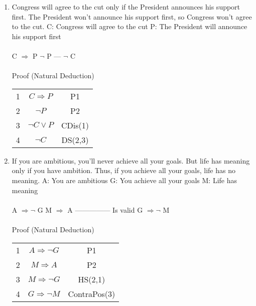 \documentclass[]{article}
\begin{document}
\begin{enumerate}
    \item Congress will agree to the cut only if the President announces his support first. The President won’t announce his support first, so Congress won’t agree to the cut.
    \newline C: Congress will agree to the cut
    \newline P: The President will announce his support first
    \\\\ C $\Rightarrow$ P
    \newline $\neg$ P
    \newline ---
    \newline $\neg$ C
    \\\\ Proof (Natural Deduction)
    \begin{tabular}{c| c | c}
        1 & $C \Rightarrow P$ & P1 \\
        2 & $\neg P$ & P2 \\
        3 & $\neg C \lor P$ & CDis(1) \\
        4 & $\neg C$ & DS(2,3) \\
    \end{tabular}

    \item If you are ambitious, you’ll never achieve all your goals. But life has meaning only if you have ambition. Thus, if you achieve all your goals, life has no meaning.
    \newline A: You are ambitious
    \newline G: You achieve all your goals
    \newline M: Life has meaning
    \\\\ A $\Rightarrow \neg$ G
    \newline M $\Rightarrow$ A
    \newline ---------------\hspace{3mm} Is valid
    \newline G $\Rightarrow \neg$ M
    \\\\ Proof (Natural Deduction)
    \begin{tabular}{c| c | c}
        1 & $A \Rightarrow \neg G$ & P1 \\
        2 & $M \Rightarrow A$ & P2 \\
        3 & $M \Rightarrow \neg G$ & HS(2,1) \\
        4 & $G \Rightarrow \neg M$ & ContraPos(3) \\
    \end{tabular}
    

\end{enumerate}
\end{document}
